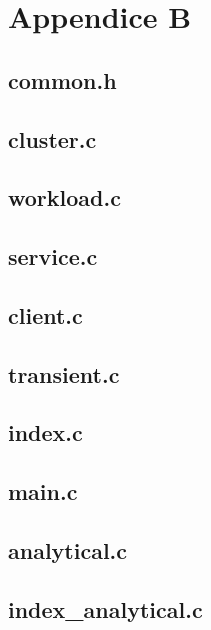 \chapter{Appendice B}\label{appendiceB}
\lstset{frame=}
\section{common.h}

\pagebreak
\section{cluster.c}

\pagebreak
\section{workload.c}

\pagebreak
\section{service.c}

\pagebreak
\section{client.c}

\pagebreak
\section{transient.c}

\pagebreak
\section{index.c}

\pagebreak
\section{main.c}

\pagebreak
\section{analytical.c}

\pagebreak
\section{index\_analytical.c}
